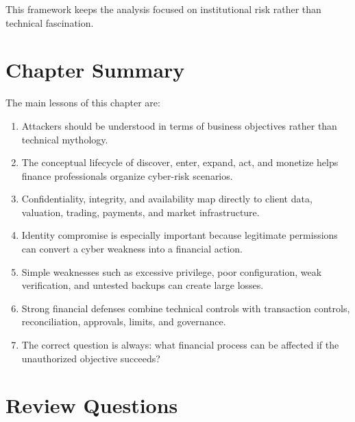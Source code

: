 This framework keeps the analysis focused on institutional risk rather than technical fascination.

\section{Chapter Summary}

The main lessons of this chapter are:

\begin{enumerate}
    \item Attackers should be understood in terms of business objectives rather than technical mythology.
    \item The conceptual lifecycle of discover, enter, expand, act, and monetize helps finance professionals organize cyber-risk scenarios.
    \item Confidentiality, integrity, and availability map directly to client data, valuation, trading, payments, and market infrastructure.
    \item Identity compromise is especially important because legitimate permissions can convert a cyber weakness into a financial action.
    \item Simple weaknesses such as excessive privilege, poor configuration, weak verification, and untested backups can create large losses.
    \item Strong financial defenses combine technical controls with transaction controls, reconciliation, approvals, limits, and governance.
    \item The correct question is always: what financial process can be affected if the unauthorized objective succeeds?
\end{enumerate}

\section{Review Questions}

